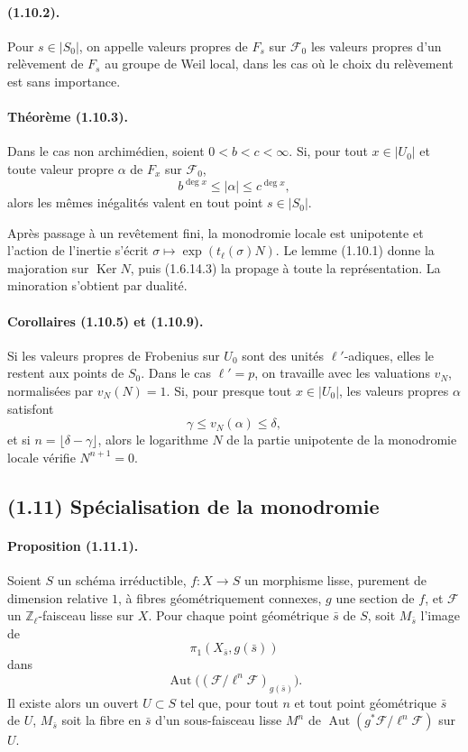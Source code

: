 \documentclass[11pt]{article}
\theoremstyle{remark}
\newcommand{\ZZ}{\mathbb{Z}}
\newcommand{\Ker}{\operatorname{Ker}}
\begin{document}
\paragraph{(1.10.2).}
Pour \(s\in|S_0|\), on appelle valeurs propres de \(F_s\) sur \(\mathcal F_0\) les valeurs propres d'un relèvement de \(F_s\) au groupe de Weil local, dans les cas où le choix du relèvement est sans importance.

\paragraph{Théorème (1.10.3).}
Dans le cas non archimédien, soient \(0<b<c<\infty\). Si, pour tout \(x\in|U_0|\) et toute valeur propre \(\alpha\) de \(F_x\) sur \(\mathcal F_0\),
\[
b^{\deg x}\le|\alpha|\le c^{\deg x},
\]
alors les mêmes inégalités valent en tout point \(s\in|S_0|\).

Après passage à un revêtement fini, la monodromie locale est unipotente et l'action de l'inertie s'écrit \(\sigma\mapsto \exp(t_\ell(\sigma)N)\). Le lemme (1.10.1) donne la majoration sur \(\Ker N\), puis (1.6.14.3) la propage à toute la représentation. La minoration s'obtient par dualité.

\paragraph{Corollaires (1.10.5) et (1.10.9).}
Si les valeurs propres de Frobenius sur \(U_0\) sont des unités \(\ell'\)-adiques, elles le restent aux points de \(S_0\). Dans le cas \(\ell'=p\), on travaille avec les valuations \(v_N\), normalisées par \(v_N(N)=1\). Si, pour presque tout \(x\in|U_0|\), les valeurs propres \(\alpha\) satisfont
\[
\gamma\le v_N(\alpha)\le\delta,
\]
et si \(n=\lfloor \delta-\gamma\rfloor\), alors le logarithme \(N\) de la partie unipotente de la monodromie locale vérifie \(N^{n+1}=0\).

\subsection*{(1.11) Spécialisation de la monodromie}

\paragraph{Proposition (1.11.1).}
Soient \(S\) un schéma irréductible, \(f:X\to S\) un morphisme lisse, purement de dimension relative \(1\), à fibres géométriquement connexes, \(g\) une section de \(f\), et \(\mathcal F\) un \(\ZZ_\ell\)-faisceau lisse sur \(X\). Pour chaque point géométrique \(\bar s\) de \(S\), soit \(M_{\bar s}\) l'image de
\[
\pi_1(X_{\bar s},g(\bar s))
\]
dans
\[
\operatorname{Aut}\bigl((\mathcal F/\ell^n\mathcal F)_{g(\bar s)}\bigr).
\]
Il existe alors un ouvert \(U\subset S\) tel que, pour tout \(n\) et tout point géométrique \(\bar s\) de \(U\), \(M_{\bar s}\) soit la fibre en \(\bar s\) d'un sous-faisceau lisse \(M^n\) de \(\operatorname{Aut}(g^*\mathcal F/\ell^n\mathcal F)\) sur \(U\).
\end{document}
